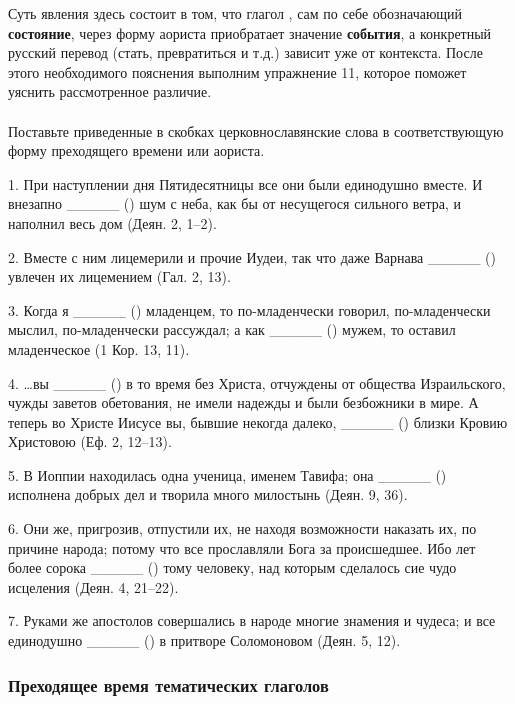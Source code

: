 \documentclass[11pt,a4paper,oneside]{memoir}
\newcommand{\exercise}{}
\begin{document}
    \medskip
    Суть явления здесь состоит в том, что глагол {}, сам по себе обозначающий \textbf{состояние}, через форму аориста приобратает значение \textbf{события}, а конкретный русский перевод (стать, превратиться и т.д.) зависит уже от контекста. После этого необходимого пояснения выполним упражнение 11, которое поможет уяснить рассмотренное различие.

                    \paragraph{\exercise}

    Поставьте приведенные в скобках церковнославянские слова в соответствующую форму преходящего времени или аориста.
    
    1. При наступлении дня Пятидесятницы все они были единодушно вместе. И внезапно _____ ({}) шум с неба, как бы от несущегося сильного ветра, и наполнил весь дом (Деян. 2, 1--2).
    
    2. Вместе с ним лицемерили и прочие Иудеи, так что даже Варнава _____ ({}) увлечен их лицемением (Гал. 2, 13).
    
    3. Когда я _____ ({}) младенцем, то по-младенчески говорил, по-младенчески мыслил, по-младенчески рассуждал; а как _____ ({}) мужем, то оставил младенческое (1 Кор. 13, 11).
    
    4. \ldots вы _____ ({}) в то время без Христа, отчуждены от общества Израильского, чужды заветов обетования, не имели надежды и были безбожники в мире. А теперь во Христе Иисусе вы, бывшие некогда далеко, _____ ({}) близки Кровию Христовою (Еф. 2, 12--13).
    
    5. В Иоппии находилась одна ученица, именем Тавифа; она _____ ({}) исполнена добрых дел и творила много милостынь (Деян. 9, 36).
    
    6. Они же, пригрозив, отпустили их, не находя возможности наказать их, по причине народа; потому что все прославляли Бога за происшедшее. Ибо лет более сорока _____ ({}) тому человеку, над которым сделалось сие чудо исцеления (Деян. 4, 21--22).
    
    7. Руками же апостолов совершались в народе многие знамения и чудеса; и все единодушно _____ ({}) в притворе Соломоновом (Деян. 5, 12).

                \subsubsection{Преходящее время тематических глаголов}
\end{document}

